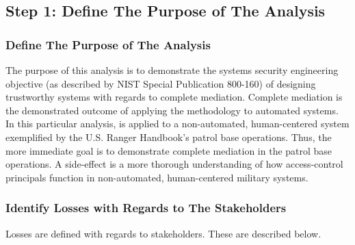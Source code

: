 \documentclass[../../main/main.tex]{subfiles}
\begin{document}
\subsection{Step 1: Define The Purpose of The Analysis}
\subsubsection{Define The Purpose of The Analysis}
The purpose of this analysis is to demonstrate the systems security engineering objective (as described by NIST Special Publication 800-160) of designing trustworthy systems with regards to complete mediation.  Complete mediation is the demonstrated outcome of applying the  methodology to automated systems.  In this particular analysis,  is applied to a non-automated, human-centered system exemplified by the U.S. Ranger Handbook's patrol base operations.  Thus, the more immediate goal is to demonstrate complete mediation in the patrol base operations.  A side-effect is a more thorough understanding of how access-control principals function in non-automated, human-centered military systems.  

\subsubsection{Identify Losses  with Regards to The Stakeholders}
Losses are defined with regards to stakeholders.  These are described below.
\end{document}
